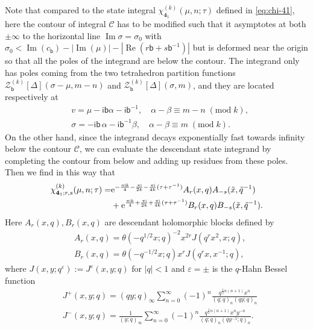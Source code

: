 \documentclass[a4paper,11pt]{article}	%
\DeclareMathOperator{\real}{Re}
\DeclareMathOperator{\imag}{Im}
\def\mc{\mathcal}
\def\md{\mathbf}
\def\ms{\mathsf}
\def\tq{\tilde{q}}
\def\tx{\tilde{x}}
\newcommand{\re}{{\rm e}}
\newcommand{\ri}{{\mathsf{i}}}
\newcommand{\nn}{\nonumber \\}
\newcommand{\bb}{\ms{b}}
\newcommand{\knot}[1]{\md{#1}}
\begin{document}
Note that compared to the state integral
$\chi_{\knot{4}_1}^{(k)}(\mu,n;\tau)$ defined in \eqref{eq:chi-41},
here the contour of integral $\mc{C}$ has to be modified such that it
asymptotes at both $\pm \infty$ to the horizontal line
$\imag{\sigma} = \sigma_0$ with
$\sigma_0 <\imag(c_\bb)-|\imag(\mu)|-|\real(r\bb+s\bb^{-1})|$ but is
deformed near the origin so that all the poles of the integrand are
below the contour.  The integrand only has poles coming from the two
tetrahedron partition functions
$\mc{Z}^{(k)}_\bb[\Delta](\sigma-\mu,m-n)$ and
$\mc{Z}^{(k)}_\bb[\Delta](\sigma,m)$, and they are located
respectively at
\begin{align}
  &v = \mu
    -\ri\bb\alpha-\ri\bb^{-1},\quad
    \alpha-\beta \equiv m-n \;(\text{mod}\; k),\\
  &\sigma =
    -\ri\bb \,\alpha -\ri\bb^{-1} \beta,\quad
    \alpha-\beta \equiv m \;(\text{mod}\; k).
\end{align}
%
On the other hand, since the integrand decays exponentially fast
towards infinity below the contour $\mc{C}$, we can evaluate the
descendant state integrand by completing the contour from below and
adding up residues from these poles.
Then we find in this way that
\begin{align}
  \chi^{(k)}_{\knot{4}_1;r,s}(\mu,n;\tau)=
  &\re^{-\frac{\pi\ri k}{4}-\frac{\pi\ri}{2k}-\frac{\pi\ri}{4k}(\tau+\tau^{-1})}
    A_r(x,q)A_{-s}(\tx,\tq^{-1}) \nn
  &+\re^{\frac{\pi\ri          k}{4}+\frac{\pi\ri}{2k}+\frac{\pi\ri}{4k}(\tau+\tau^{-1})}
    B_r(x,q)B_{-s}(\tx,\tq^{-1}).
\end{align}
Here $A_r(x,q), B_r(x,q)$ are descendant holomorphic blocks defined by
\begin{align}
  &A_r(x,q) = \theta(-q^{1/2}x;q)^{-2}x^{2r} J(q^rx^2,x;q),\\
  &B_r(x,q) = \theta(-q^{-1/2}x;q)x^r J(q^r x,x^{-1};q),
\end{align}
where $J(x,y;q^\varepsilon):= J^{\varepsilon}(x,y;q)$ for $|q|<1$ and
$\varepsilon = \pm$ is the $q$-Hahn Bessel function
\begin{subequations}
  \begin{align}
    &J^+(x,y;q) = (qy;q)_\infty \sum_{n=0}^\infty
      (-1)^n\frac{q^{\frac{1}{2}n(n+1)}x^n}{(q;q)_n(qy;q)_n}\\
    &J^-(x,y;q) = \frac{1}{(y;q)_\infty} \sum_{n=0}^\infty
      (-1)^n\frac{q^{\frac{1}{2}n(n+1)}x^ny^{-n}}{(q;q)_n(qy^{-1};q)_n}.  
  \end{align}
\end{subequations}
\end{document}
